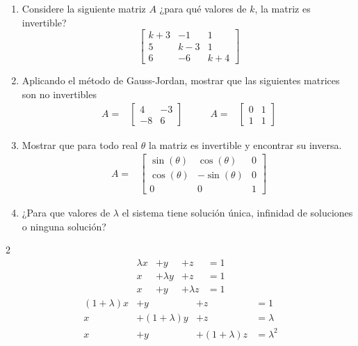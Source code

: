\documentclass[
]{article}
\begin{document}
\begin{enumerate}
\def\labelenumi{\arabic{enumi}.}
\setcounter{enumi}{8}
\item
  Considere la siguiente matriz \(A\) ¿para qué valores de \(k\), la
  matriz es invertible? \begin{equation*}
    \begin{bmatrix}
    k+3 & -1    &  1  \\
    5   & k-3   &  1\\
    6   & -6    & k+4
    \end{bmatrix}
  \end{equation*}
\item
  Aplicando el método de Gauss-Jordan, mostrar que las siguientes
  matrices son no invertibles \begin{equation*}
  \begin{array}{cccc}
  A= & 
    \begin{bmatrix} 
  4 & -3\\ 
  -8 & 6
    \end{bmatrix} \quad \quad
     &
  A= & 
    \begin{bmatrix} 
  0  & 1 \\ 
  1  & 1
    \end{bmatrix}
  \end{array}
  \end{equation*}
\item
  Mostrar que para todo real \(\theta\) la matriz es invertible y
  encontrar su inversa. \begin{equation*}
  \begin{array}{cc}
  A= & 
    \begin{bmatrix} 
  \sin(\theta)  & \cos(\theta)  & 0\\ 
  \cos(\theta)  & -\sin(\theta)  & 0\\
  0  & 0  & 1
    \end{bmatrix}
  \end{array}
  \end{equation*}
\item
  ¿Para que valores de \(\lambda\) el sistema tiene solución única,
  infinidad de soluciones o ninguna solución?
\end{enumerate}

\begin{multicols}{2}
\begin{equation*}
  \begin{array}{cccc}
     \lambda x   & + y   & + z    &= 1  \\
      x   & + \lambda y  & + z    & = 1\\
      x   & +  y  & +\lambda z    & =1
  \end{array}
\end{equation*}
\begin{equation*}
  \begin{array}{cccc}
     (1+\lambda) x   & + y   & + z    & = 1  \\
      x   & +(1+\lambda) y  & + z     & = \lambda  \\
      x   & +  y  & + (1+\lambda)z    & = \lambda^2
  \end{array}
\end{equation*}
\end{multicols}
\end{document}
